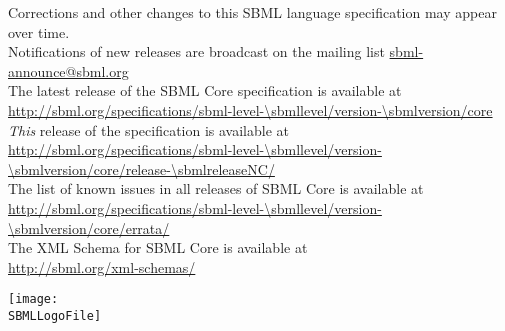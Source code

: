 \begin{center}
Corrections and other changes to this SBML language specification may appear over time.\\
Notifications of new releases are broadcast on the mailing list \href{http://www.sbml.org/forums}{sbml-announce@sbml.org}\\[10pt]

The latest release of the SBML \thisLV Core specification is available at\\
\url{http://sbml.org/specifications/sbml-level-\sbmllevel/version-\sbmlversion/core}\\[10pt]

\emph{This} release of the specification is available at\\
\url{http://sbml.org/specifications/sbml-level-\sbmllevel/version-\sbmlversion/core/release-\sbmlreleaseNC/}\\[10pt]

The list of known issues in all releases of SBML \thisLV Core is available at\\
\url{http://sbml.org/specifications/sbml-level-\sbmllevel/version-\sbmlversion/core/errata/}\\[10pt]

The XML Schema for SBML \thisLV Core is available at\\
\url{http://sbml.org/xml-schemas/}\\[10pt]
\end{center}

\vfill

\centerline{\texttt{[image: \\SBMLLogoFile]}}
